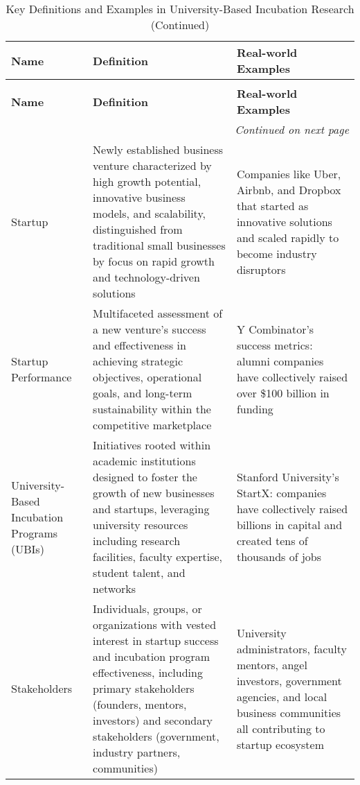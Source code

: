 \documentclass[../Main.tex]{subfiles}
\begin{document}
\begin{longtable}{|p{2.5cm}|p{6cm}|p{5cm}|}
\caption{Key Definitions and Examples in University-Based Incubation Research}
\label{tab:key_definitions} \\
\hline
\textbf{Name} & \textbf{Definition} & \textbf{Real-world Examples} \\
\hline
\endfirsthead
\caption[]{Key Definitions and Examples in University-Based Incubation Research (Continued)} \\
\hline
\textbf{Name} & \textbf{Definition} & \textbf{Real-world Examples} \\
\hline
\endhead
\hline
\multicolumn{3}{r}{\textit{Continued on next page}} \\
\endfoot
\hline
\endlastfoot
Startup & Newly established business venture characterized by high growth potential, innovative business models, and scalability, distinguished from traditional small businesses by focus on rapid growth and technology-driven solutions \autocite{kauffman2013mentoring, sullivan2011effectiveness} & Companies like Uber, Airbnb, and Dropbox that started as innovative solutions and scaled rapidly to become industry disruptors \\
\hline
Startup Performance & Multifaceted assessment of a new venture's success and effectiveness in achieving strategic objectives, operational goals, and long-term sustainability within the competitive marketplace \autocite{patton2014realising, barbero2012revisiting} & Y Combinator's success metrics: alumni companies have collectively raised over \$100 billion in funding \autocite{YCombinator2024} \\
\hline
University-Based Incubation Programs (UBIs) & Initiatives rooted within academic institutions designed to foster the growth of new businesses and startups, leveraging university resources including research facilities, faculty expertise, student talent, and networks \autocite{grimaldi2005university, siegel2003assessing} & Stanford University's StartX: companies have collectively raised billions in capital and created tens of thousands of jobs \autocite{StartX2024} \\
\hline
Stakeholders & Individuals, groups, or organizations with vested interest in startup success and incubation program effectiveness, including primary stakeholders (founders, mentors, investors) and secondary stakeholders (government, industry partners, communities) \autocite{miller1983correlates, bandura1997self} & University administrators, faculty mentors, angel investors, government agencies, and local business communities all contributing to startup ecosystem \\

\end{longtable}
\end{document}
